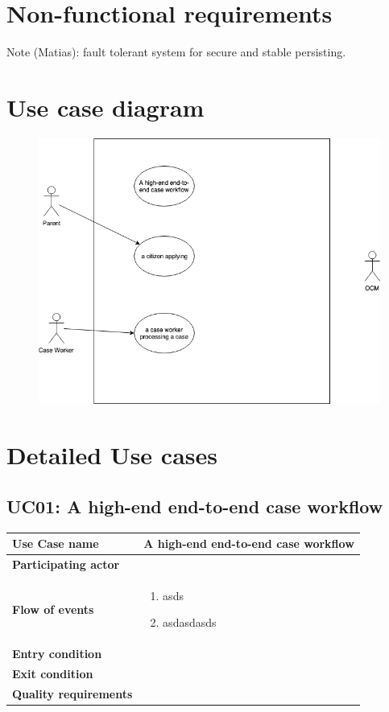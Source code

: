 \documentclass{article}
\begin{document}
\section{Non-functional requirements}

Note (Matias): fault tolerant system for secure and stable persisting.

\section{Use case diagram}


\begin{figure}[htb!]
	\includegraphics[width=\textwidth]{img/use-cases}
\end{figure}


\section{Detailed Use cases}

\subsection{UC01: A high-end end-to-end case workflow}

\begin{tabularx}{\textwidth}{l|l}
	\textbf{Use Case name} & A high-end end-to-end case workflow \\
	\hline
	\textbf{Participating actor} & \\
	\hline
	\textbf{Flow of events} &
	\begin{minipage}{\linewidth}
		\begin{enumerate}
			\item asds
			\item asdasdasds
		\end{enumerate} 
	\end{minipage}\\
	\hline
	\textbf{Entry condition} & \\
	\hline
	\textbf{Exit condition} & \\
	\hline
	\textbf{Quality requirements} & \\
\end{tabularx}
\end{document}
